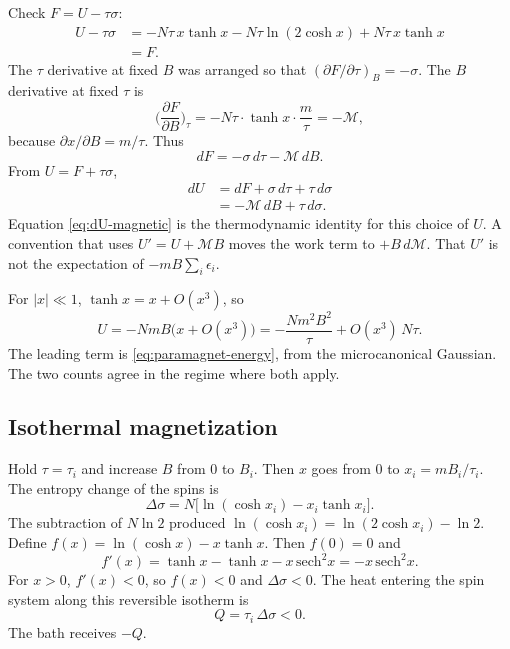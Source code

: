 Check \(F = U - \tau\sigma\):
\begin{align}
U - \tau\sigma
&= -N\tau\, x\tanh x
 - N\tau\ln(2\cosh x)
 + N\tau\, x\tanh x \nonumber\\
&= F.
\label{eq:F-check}
\end{align}
The \(\tau\) derivative at fixed \(B\) was arranged so that \((\partial F/\partial\tau)_B = -\sigma\). The \(B\) derivative at fixed \(\tau\) is
\begin{equation}
\label{eq:dF-dB}
\biggl(\frac{\partial F}{\partial B}\biggr)_{\tau}
= -N\tau\cdot\tanh x\cdot\frac{m}{\tau}
= -\mathcal{M},
\end{equation}
because \(\partial x/\partial B = m/\tau\). Thus
\begin{equation}
\label{eq:dF-magnetic}
dF = -\sigma\, d\tau - \mathcal{M}\, dB.
\end{equation}
From \(U = F + \tau\sigma\),
\begin{align}
dU
&= dF + \sigma\, d\tau + \tau\, d\sigma \nonumber\\
&= -\mathcal{M}\, dB + \tau\, d\sigma.
\label{eq:dU-magnetic}
\end{align}
Equation \eqref{eq:dU-magnetic} is the thermodynamic identity for this choice of \(U\). A convention that uses \(U' = U + \mathcal{M} B\) moves the work term to \(+B\, d\mathcal{M}\). That \(U'\) is not the expectation of \(-mB\sum_i \epsilon_i\).

For \(|x|\ll 1\), \(\tanh x = x + O(x^3)\), so
\begin{equation}
\label{eq:curie-energy}
U = -N m B\bigl(x + O(x^3)\bigr)
= -\frac{N m^2 B^2}{\tau} + O(x^3)\, N\tau.
\end{equation}
The leading term is \eqref{eq:paramagnet-energy}, from the microcanonical Gaussian. The two counts agree in the regime where both apply.

\subsection{Isothermal magnetization}

Hold \(\tau = \tau_i\) and increase \(B\) from \(0\) to \(B_i\). Then \(x\) goes from \(0\) to \(x_i = m B_i/\tau_i\). The entropy change of the spins is
\begin{equation}
\label{eq:delta-sigma-mag}
\Delta\sigma
= N\bigl[\ln(\cosh x_i) - x_i\tanh x_i\bigr].
\end{equation}
The subtraction of \(N\ln 2\) produced \(\ln(\cosh x_i) = \ln(2\cosh x_i) - \ln 2\). Define \(f(x) = \ln(\cosh x) - x\tanh x\). Then \(f(0) = 0\) and
\begin{equation}
\label{eq:f-prime}
f'(x)
= \tanh x - \tanh x - x\,\mathrm{sech}^2 x
= -x\,\mathrm{sech}^2 x.
\end{equation}
For \(x>0\), \(f'(x)<0\), so \(f(x)<0\) and \(\Delta\sigma<0\). The heat entering the spin system along this reversible isotherm is
\begin{equation}
\label{eq:heat-to-bath}
Q = \tau_i\,\Delta\sigma < 0.
\end{equation}
The bath receives \(-Q\).

